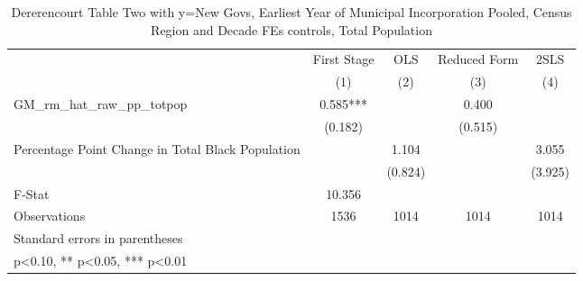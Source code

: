 \begin{table}[htbp]\centering
\def\sym#1{\ifmmode^{#1}\else\(^{#1}\)\fi}
\caption{Dererencourt Table Two with y=New Govs, Earliest Year of Municipal Incorporation  Pooled, Census Region and Decade FEs controls, Total Population}
\begin{tabular}{l*{4}{c}}
\toprule
                    & First Stage   &         OLS   &Reduced Form   &        2SLS   \\
                    &\multicolumn{1}{c}{(1)}   &\multicolumn{1}{c}{(2)}   &\multicolumn{1}{c}{(3)}   &\multicolumn{1}{c}{(4)}   \\
\midrule
GM\_rm\_hat\_raw\_pp\_totpop&       0.585***&               &       0.400   &               \\
                    &     (0.182)   &               &     (0.515)   &               \\
\addlinespace
Percentage Point Change in Total Black Population&               &       1.104   &               &       3.055   \\
                    &               &     (0.824)   &               &     (3.925)   \\
\midrule
F-Stat              &      10.356   &               &               &               \\
Observations        &        1536   &        1014   &        1014   &        1014   \\
\bottomrule
\multicolumn{5}{l}{\footnotesize Standard errors in parentheses}\\
\multicolumn{5}{l}{\footnotesize * p<0.10, ** p<0.05, *** p<0.01}\\
\end{tabular}
\end{table}
